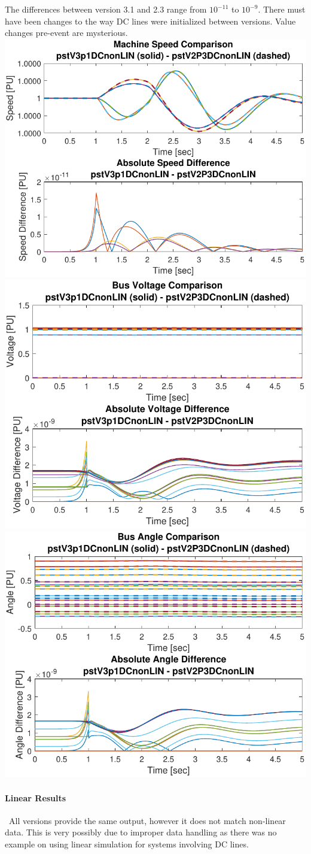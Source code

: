 \documentclass[12pt]{article}
\begin{document}
The differences between version 3.1 and 2.3 range from  $10^{-11}$ to $10^{-9}$.
There must have been changes to the way DC lines were initialized between versions. 
Value changes pre-event are mysterious.\\

\includegraphics[width=.3\linewidth]{pstV3p1DCnonLINpstV2P3DCnonLINMacSpd} %
\includegraphics[width=.3\linewidth]{pstV3p1DCnonLINpstV2P3DCnonLINBusV} %
\includegraphics[width=.3\linewidth]{pstV3p1DCnonLINpstV2P3DCnonLINAngle} 

\paragraph{Linear Results} \ 
All versions provide the same output, however it does not match non-linear data.
This is very possibly due to improper data handling as there was no example on using linear simulation for systems involving DC lines.
\end{document}
